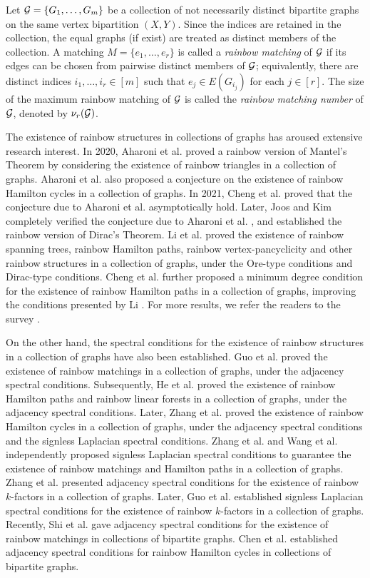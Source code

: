 \documentclass[11pt,a4paper]{article}
\theoremstyle{definition}
\numberwithin{equation}{section}
\begin{document}
Let ${\cal G}=\{G_1,\ldots,G_m\}$ be a collection of not necessarily distinct bipartite graphs on the same vertex bipartition $(X,Y)$. Since the indices are retained in the collection, the equal graphs (if exist) are treated as distinct members of the collection. A matching $M=\{e_1,\ldots,e_r\}$ is called a \emph{rainbow matching} of ${\cal G}$ if its edges can be chosen from pairwise distinct members of ${\cal G}$; equivalently, there are distinct indices $i_1,\ldots,i_r\in[m]$ such that $e_j\in E(G_{i_j})$ for each $j\in[r]$. The size of the maximum rainbow matching of ${\cal G}$ is called the \emph{rainbow matching number} of ${\cal G}$, denoted by $\nu_r({\cal G})$.

The existence of rainbow structures in collections of graphs has aroused extensive research interest. In 2020, Aharoni et al. \cite{Aharoni} proved a rainbow version of Mantel's Theorem by considering the existence of rainbow triangles in a collection of graphs. Aharoni et al. \cite{Aharoni} also proposed a conjecture on the existence of rainbow Hamilton cycles in a collection of graphs. In 2021, Cheng et al. \cite{Cheng-Wang} proved that the conjecture due to Aharoni et al. \cite{Aharoni} asymptotically hold. Later, Joos and Kim \cite{Joos} completely verified the conjecture due to Aharoni et al. \cite{Aharoni}, and established the rainbow version of Dirac's Theorem. Li et al. \cite{Li-Li} proved the existence of rainbow spanning trees, rainbow Hamilton paths, rainbow vertex-pancyclicity and other rainbow structures in a collection of graphs, under the Ore-type conditions and Dirac-type conditions. Cheng et al. \cite{Cheng-Sun} further proposed a minimum degree condition for the existence of rainbow Hamilton paths in a collection of graphs, improving the conditions presented by Li \cite{Li-Li}. For more results, we refer the readers to the survey \cite{Sun}.

On the other hand, the spectral conditions for the existence of rainbow structures in a collection of graphs have also been established. Guo et al. \cite{Guo} proved the existence of rainbow matchings in a collection of graphs, under the adjacency spectral conditions. Subsequently, He et al. \cite{He} proved the existence of rainbow Hamilton paths and rainbow linear forests in a collection of graphs, under the adjacency spectral conditions. Later, Zhang et al. \cite{Y.Zhang} proved the existence of rainbow Hamilton cycles in a collection of graphs, under the adjacency spectral conditions and the signless Laplacian spectral conditions. Zhang et al. \cite{X.Zhang} and Wang et al. \cite{Wang} independently proposed signless Laplacian spectral conditions to guarantee the existence of rainbow matchings and Hamilton paths in a collection of graphs. Zhang et al. \cite{L.Zhang} presented adjacency spectral conditions for the existence of rainbow $k$-factors in a collection of graphs. Later, Guo et al. \cite{Guo-Pan} established signless Laplacian spectral conditions for the existence of rainbow $k$-factors in a collection of graphs. Recently, Shi et al. \cite{Shi} gave adjacency spectral conditions for the existence of rainbow matchings in collections of bipartite graphs. Chen et al. \cite{Chen} established adjacency spectral conditions for rainbow Hamilton cycles in collections of bipartite graphs.
\end{document}
